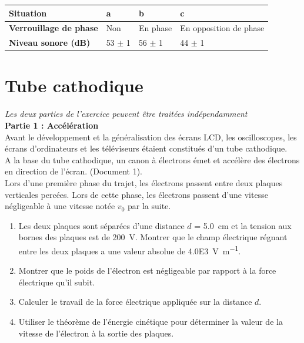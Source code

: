 \documentclass[a4paper,11pt,fleqn]{article}%
\begin{document}
\begin{tabular}{|>{\centering}m{4cm}|>{\centering}m{4cm}|>{\centering}m{4cm}|>{\centering \arraybackslash}m{4cm}|} \hline
\textbf{Situation} & a & b & c\\ \hline
\textbf{Verrouillage de phase} & Non & En phase & En opposition de phase \\ \hline
\textbf{Niveau sonore (\unit{\deci\bel})} & \num{53} $\pm$ \num{1} & \num{56} $\pm$ \num{1} &\num{44} $\pm$ \num{1} \\ \hline
\end{tabular}

\newpage
\section{Tube cathodique}
\emph{Les deux parties de l'exercice peuvent être traitées indépendamment}\\
\textbf{Partie 1 : Accélération}\\
Avant le développement et la généralisation des écrans LCD, les oscilloscopes, les écrans d'ordinateurs et les téléviseurs étaient constitués d'un tube cathodique.\\
A la base du tube cathodique, un canon à électrons émet et accélère des électrons en direction de l'écran. (Document 1).\\ Lors d'une première phase du trajet, les électrons passent entre deux plaques verticales percées. Lors de cette phase, les électrons passent d'une vitesse négligeable à une vitesse notée $v_0$ par la suite.
\begin{enumerate}
	\item Les deux plaques sont séparées d'une distance $d$ = \SI{5,0}{cm} et la tension aux bornes des plaques est de \SI{200}{V}. Montrer que le  champ électrique régnant entre les deux plaques a une valeur absolue de \SI{4.0E3}{\volt\per\meter}.
	\item Montrer que le poids de l'électron est négligeable par rapport à la force électrique qu'il subit.
	\item Calculer le travail de la force électrique appliquée sur la distance $d$.
	\item Utiliser le théorème de l'énergie cinétique pour déterminer la valeur de la vitesse de l'électron à la sortie des plaques.
\end{enumerate}
\end{document}
